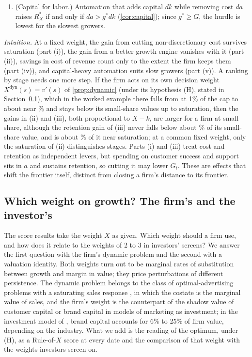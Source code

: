 \begin{corollary}
\begin{enumerate}
\item[(v)] (Capital for labor.) Automation that adds capital $dk$ while removing cost $da$ raises $R_X^*$ if and only if $da>g^*dk$ (\autoref{cor:capital}); since $g^*\ge G$, the hurdle is lowest for the slowest growers.
\end{enumerate}
\end{corollary}

\noindent\emph{Intuition.} At a fixed weight, the gain from cutting non-discretionary cost survives saturation (part (i)), the gain from a better growth engine vanishes with it (part (ii)), savings in cost of revenue count only to the extent the firm keeps them (part (iv)), and capital-heavy automation suits slow growers (part (v)). A ranking by stage needs one more step. If the firm acts on its own decision weight $X^{\mathrm{dyn}}(s)=v'(s)$ of \autoref{prop:dynamic} (under its hypothesis (H), stated in Section~\ref{sec:model-valuation}), which in the worked example there falls from \VpOnePct{} at 1\% of the cap to about \VpMin{} near \VpMinAt\% and stays below its small-share values up to saturation, then the gains in (ii) and (iii), both proportional to $X-k$, are larger for a firm at small share, although the retention gain of (iii) never falls below about \VpGainShare\% of its small-share value, and is about \VpGainShareSat\% of it near saturation; at a common fixed weight, only the saturation of (ii) distinguishes stages. Parts (i) and (iii) treat cost and retention as independent levers, but spending on customer success and support sits in $a$ and sustains retention, so cutting it may lower $G_i$. These are effects that shift the frontier itself, distinct from closing a firm's distance to its frontier.

\subsection{Which weight on growth? The firm's and the investor's}\label{sec:model-valuation}

The score results take the weight $X$ as given. Which weight should a firm use, and how does it relate to the weights of 2 to 3 in investors' screens? We answer the first question with the firm's dynamic problem and the second with a valuation identity. Both weights turn out to be marginal rates of substitution between growth and margin in value; they price perturbations of different persistence. The dynamic problem belongs to the class of optimal-advertising problems with a saturating sales response \citep{sethi1973optimal,sethi1977dynamic,feichtinger1994dynamic}, in which the costate is the marginal value of sales, and the firm's weight is the counterpart of the shadow value of customer capital \citep{gourio2014customer} or brand capital \citep{vitorino2014understanding} in models of marketing as investment; in the investment model of \citet{belo2022decomposing}, brand capital accounts for 6\% to 25\% of firm value, depending on the industry. What we add is the reading of the optimum, under (H), as a Rule-of-$X$ score at every date and the comparison of that weight with the weights investors screen on.

